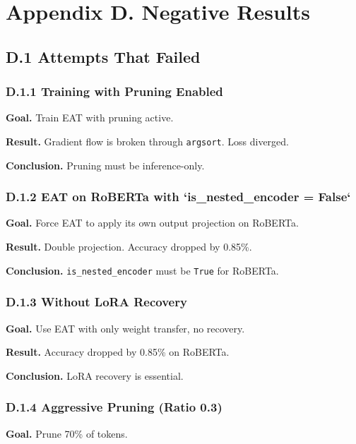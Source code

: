 
\section{Appendix D. Negative Results}

\subsection{D.1 Attempts That Failed}

\subsubsection{D.1.1 Training with Pruning Enabled}

\textbf{Goal.} Train EAT with pruning active.

\textbf{Result.} Gradient flow is broken through \texttt{argsort}. Loss diverged.

\textbf{Conclusion.} Pruning must be inference-only.

\subsubsection{D.1.2 EAT on RoBERTa with `is\_nested\_encoder = False`}

\textbf{Goal.} Force EAT to apply its own output projection on RoBERTa.

\textbf{Result.} Double projection. Accuracy dropped by 0.85\%.

\textbf{Conclusion.} \texttt{is\_nested\_encoder} must be \texttt{True} for RoBERTa.

\subsubsection{D.1.3 Without LoRA Recovery}

\textbf{Goal.} Use EAT with only weight transfer, no recovery.

\textbf{Result.} Accuracy dropped by 0.85\% on RoBERTa.

\textbf{Conclusion.} LoRA recovery is essential.

\subsubsection{D.1.4 Aggressive Pruning (Ratio 0.3)}

\textbf{Goal.} Prune 70\% of tokens.

